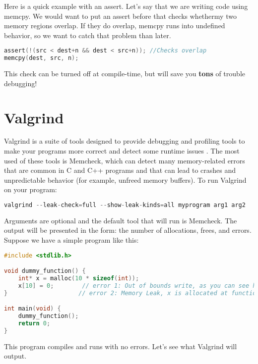 Here is a quick example with an assert.
Let's say that we are writing code using memcpy.
We would want to put an assert before that checks whethermy two memory regions overlap.
If they do overlap, memcpy runs into undefined behavior, so we want to catch that problem than later.

\begin{lstlisting}[language=C]
assert(!(src < dest+n && dest < src+n)); //Checks overlap
memcpy(dest, src, n);
\end{lstlisting}

This check can be turned off at compile-time, but will save you \textbf{tons} of trouble debugging!

\section{Valgrind}

Valgrind is a suite of tools designed to provide debugging and profiling tools to make your programs more correct and detect some runtime issues \cite{valgrind}.
The most used of these tools is Memcheck, which can detect many memory-related errors that are common in C and C++ programs and that can lead to crashes and unpredictable behavior (for example, unfreed memory buffers).
To run Valgrind on your program:

\begin{lstlisting}[language=C]
valgrind --leak-check=full --show-leak-kinds=all myprogram arg1 arg2
\end{lstlisting}

Arguments are optional and the default tool that will run is Memcheck.
The output will be presented in the form: the number of allocations, frees, and errors.
Suppose we have a simple program like this:

\begin{lstlisting}[language=C]
#include <stdlib.h>

void dummy_function() {
	int* x = malloc(10 * sizeof(int));
	x[10] = 0;        // error 1: Out of bounds write, as you can see here we write to an out of bound memory address.
}                    // error 2: Memory Leak, x is allocated at function exit.

int main(void) {
	dummy_function();
	return 0;
}
\end{lstlisting}

This program compiles and runs with no errors.
Let's see what Valgrind will output.

